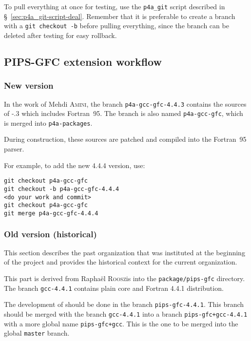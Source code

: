 \documentclass[a4paper]{article}
\begin{document}
To pull everything at once for testing, use the
\verb|p4a_git| script described in
\S~\ref{sec:p4a_git-script-deal}. Remember that
it is preferable to create a branch with a \texttt{git checkout
  -b} before pulling everything, since the branch can be deleted after
testing for easy rollback.


\subsection{PIPS-GFC extension workflow}
\label{sec:pips-gfc-workflow}

\subsubsection{New version}
\label{sec:new-version}

In the work of Mehdi \textsc{Amini}, the branch
\texttt{p4a-gcc-gfc-4.4.3} contains the sources of \Agcc-.3
which includes Fortran~95. The branch is also named \texttt{p4a-gcc-gfc},
which is merged into \texttt{p4a-packages}.

During \Apfa construction, these sources are patched and compiled into the
\Apips Fortran~95 parser.

For example, to add the new 4.4.4 version, use:
\begin{verbatim}
git checkout p4a-gcc-gfc
git checkout -b p4a-gcc-gfc-4.4.4
<do your work and commit>
git checkout p4a-gcc-gfc
git merge p4a-gcc-gfc-4.4.4
\end{verbatim}


\subsubsection{Old version (historical)}
\label{sec:old-version}


This section describes the past organization that was instituted at
the beginning of the project and provides the historical context for
the current organization.

This part is derived from Raphaël \textsc{Roosz}is into the
\texttt{package/pips-gfc}
directory. The branch \texttt{gcc-4.4.1} contains plain \Agcc core and Fortran 4.4.1 distribution.

The development of \Apipsgfc should be done in the branch
\texttt{pips-gfc-4.4.1}. This branch should be merged with the
branch \texttt{gcc-4.4.1} into a branch \texttt{pips-gfc+gcc-4.4.1} with a
more global name \texttt{pips-gfc+gcc}. This is the one to be merged
into the global \texttt{master} branch.
\end{document}

